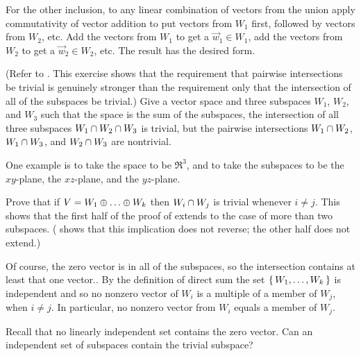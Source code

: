 \begin{exercises}
\begin{answer}
       For the other inclusion, to any linear combination of vectors from
       the union apply commutativity of vector addition to
       put vectors from \( W_1 \) first, followed by vectors from \( W_2 \), 
       etc.
       Add the vectors from \( W_1 \) to get a \( \vec{w}_1\in W_1 \),
       add the vectors from \( W_2 \) to get a \( \vec{w}_2\in W_2 \), etc.
       The result has the desired form.
     \end{answer}
  \item \label{exer:ThreeSubsPairwseNonTriv}
    (Refer to .
    This exercise 
    shows that the requirement that pairwise intersections be trivial
    is genuinely stronger than the requirement only that the intersection of
    all of the subspaces be trivial.)
    Give a vector space and three subspaces $W_1$, $W_2$, and $W_3$
    such that the space is the sum of the subspaces, 
    the intersection of all three subspaces
    $W_1\cap W_2\cap W_3$ is trivial, 
    but the pairwise intersections 
    $W_1\cap W_2$, $W_1\cap W_3$, and $W_2\cap W_3$
    are nontrivial.
    \begin{answer}
      One example is to take the space to be $\Re^3$, and to take the
      subspaces to be the $xy$-plane, the $xz$-plane, and the $yz$-plane.
    \end{answer}
  \recommended \item 
    Prove that if \( V=W_1\directsum\dots\directsum W_k \) then
    \( W_i\cap W_j \) is trivial whenever \( i\neq j \).
    This shows that the first half of the proof of 
     extends to the case of more than two
    subspaces.
    ( shows that this implication does
    not reverse; the other half does not extend.)
    \begin{answer}
      Of course, the zero vector is in all of the subspaces, so the 
      intersection contains at least that one vector..  
      By the definition of direct sum the set
      \( \mbox{$\{\,W_1,\dots,W_k\,\}$} \) is independent and so no nonzero vector
      of \( W_i \) is a multiple of a member of \( W_j \), when
      \( i\neq j \).
      In particular, no nonzero vector from \( W_i \) equals a member of
      \( W_j \).
    \end{answer}
  \item 
    Recall that no linearly independent set contains the zero vector.
    Can an independent set of subspaces contain the trivial subspace?

\end{exercises}

